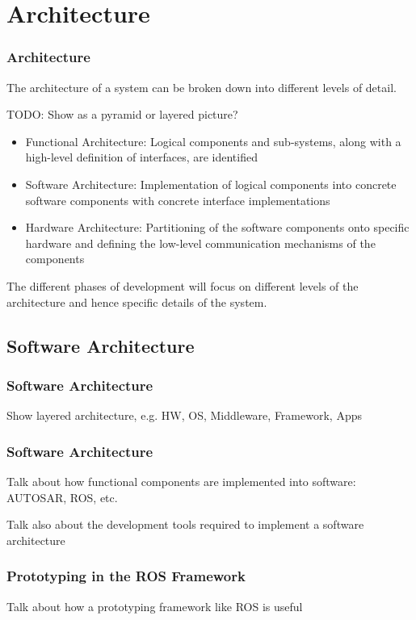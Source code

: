 \documentclass{beamer}
\begin{document}
\section{Architecture}

\begin{frame}
\frametitle{Architecture}
The architecture of a system can be broken down into different levels of
detail.

TODO: Show as a pyramid or layered picture?

\begin{itemize}
    \item Functional Architecture: Logical components and sub-systems, along
        with a high-level definition of interfaces, are identified
    \item Software Architecture: Implementation of logical components into
        concrete software components with concrete interface implementations
    \item Hardware Architecture: Partitioning of the software components onto
        specific hardware and defining the low-level communication mechanisms
        of the components
\end{itemize}

The different phases of development will focus on different levels of
the architecture and hence specific details of the system.
\end{frame}



\subsection{Software Architecture}

\begin{frame}
\frametitle{Software Architecture}
Show layered architecture, e.g. HW, OS, Middleware, Framework, Apps
\end{frame}

\begin{frame}
\frametitle{Software Architecture}
Talk about how functional components are implemented into software:
AUTOSAR, ROS, etc.

Talk also about the development tools required to implement a software 
architecture
\end{frame}

\begin{frame}
\frametitle{Prototyping in the ROS Framework}
Talk about how a prototyping framework like ROS is useful
\end{frame}
\end{document}
